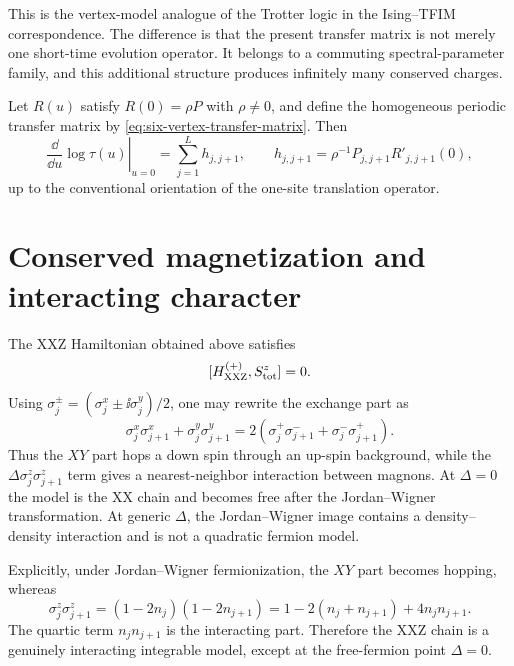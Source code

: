 This is the vertex-model analogue of the Trotter logic in the Ising--TFIM
correspondence.  The difference is that the present transfer matrix is not merely
one short-time evolution operator.  It belongs to a commuting spectral-parameter
family, and this additional structure produces infinitely many conserved charges.

\begin{proposition}
\label{prop:regular-transfer-local-charge}
Let $R(u)$ satisfy $R(0)=\rho P$ with $\rho\neq0$, and define the homogeneous
periodic transfer matrix by \cref{eq:six-vertex-transfer-matrix}.  Then
\begin{equation}
    \left.\frac{\dd}{\dd u}\log\tau(u)\right|_{u=0}
    =
    \sum_{j=1}^{L}h_{j,j+1},
    \qquad
    h_{j,j+1}=\rho^{-1}P_{j,j+1}R'_{j,j+1}(0),
\end{equation}
up to the conventional orientation of the one-site translation operator.
\end{proposition}

\section{Conserved magnetization and interacting character}
\label{sec:six-vertex-conserved-magnetization-interaction}

The XXZ Hamiltonian obtained above satisfies
\begin{equation}
\label{eq:xxz-U1-symmetry}
    [H_{\rm XXZ}^{(+)},S^z_{\rm tot}]=0 .
\end{equation}
Using $\sigma_j^\pm=(\sigma_j^x\pm\ii\sigma_j^y)/2$, one may rewrite the exchange
part as
\begin{equation}
\label{eq:xxz-ladder-form}
    \sigma_j^x\sigma_{j+1}^x+
    \sigma_j^y\sigma_{j+1}^y
    =
    2\left(
        \sigma_j^+\sigma_{j+1}^-
        +
        \sigma_j^-\sigma_{j+1}^+
    \right).
\end{equation}
Thus the $XY$ part hops a down spin through an up-spin background, while the
$\Delta\sigma_j^z\sigma_{j+1}^z$ term gives a nearest-neighbor interaction between
magnons.  At $\Delta=0$ the model is the XX chain and becomes free after the
Jordan--Wigner transformation.  At generic $\Delta$, the Jordan--Wigner image
contains a density--density interaction and is not a quadratic fermion model.

Explicitly, under Jordan--Wigner fermionization, the $XY$ part becomes hopping,
whereas
\begin{equation}
\label{eq:xxz-density-density-interaction}
    \sigma_j^z\sigma_{j+1}^z
    =
    (1-2n_j)(1-2n_{j+1})
    =
    1-2(n_j+n_{j+1})+4n_jn_{j+1} .
\end{equation}
The quartic term $n_jn_{j+1}$ is the interacting part.  Therefore the XXZ chain
is a genuinely interacting integrable model, except at the free-fermion point
$\Delta=0$.

